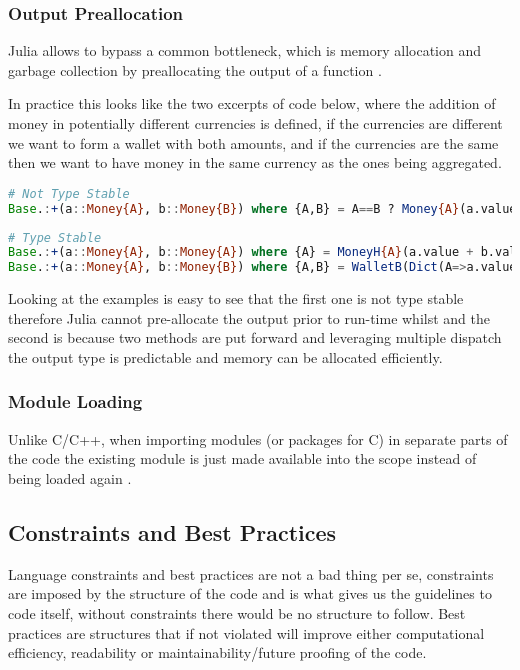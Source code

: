 \subsubsection{Output Preallocation}
Julia allows to bypass a common bottleneck, which is memory allocation and garbage collection by preallocating the output of a function \cite{julia_performance_tips}.

In practice this looks like the two excerpts of code below, where the addition of money in potentially different currencies is defined, if the currencies are different we want to form a wallet with both amounts, and if the currencies are the same then we want to have money in the same currency as the ones being aggregated.
\begin{lstlisting}[language=Julia]
# Not Type Stable
Base.:+(a::Money{A}, b::Money{B}) where {A,B} = A==B ? Money{A}(a.value + b.value) : Wallet(Dict(A=>a.value,B=>b.value)) 
\end{lstlisting}
\begin{lstlisting}[language=Julia]
# Type Stable
Base.:+(a::Money{A}, b::Money{A}) where {A} = MoneyH{A}(a.value + b.value) 
Base.:+(a::Money{A}, b::Money{B}) where {A,B} = WalletB(Dict(A=>a.value,B=>b.value)) 
\end{lstlisting}
Looking at the examples is easy to see that the first one is not type stable therefore Julia cannot pre-allocate the output prior to run-time whilst and the second is because two methods are put forward and leveraging multiple dispatch the output type is predictable and memory can be allocated efficiently.

\subsubsection{Module Loading}
Unlike C/C++,  when importing modules (or packages for C) in separate parts of the code the existing module is just made available into the scope instead of being loaded again \cite{julia_differences}. 
\subsection{Constraints and Best Practices}

Language constraints and best practices are not a bad thing per se, constraints are imposed by the structure of the code and is what gives us the guidelines to code itself, without constraints there would be no structure to follow. Best practices are structures that if not violated will improve either computational efficiency, readability or maintainability/future proofing of the code.

